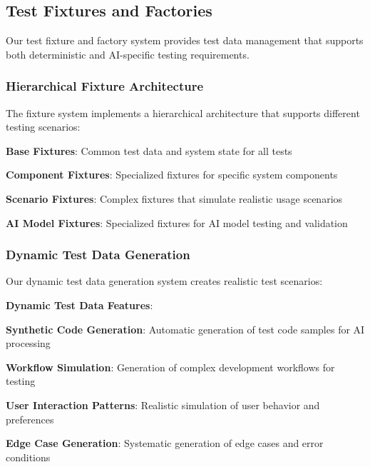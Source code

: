 \subsection*{Test Fixtures and Factories}

Our test fixture and factory system provides test data management that supports both deterministic and AI-specific testing requirements.

\subsubsection*{Hierarchical Fixture Architecture}

The fixture system implements a hierarchical architecture that supports different testing scenarios:

\begin{compactlist}
    \item \textbf{Base Fixtures}: Common test data and system state for all tests
    \item \textbf{Component Fixtures}: Specialized fixtures for specific system components
    \item \textbf{Scenario Fixtures}: Complex fixtures that simulate realistic usage scenarios
    \item \textbf{AI Model Fixtures}: Specialized fixtures for AI model testing and validation
\end{compactlist}

\subsubsection*{Dynamic Test Data Generation}

Our dynamic test data generation system creates realistic test scenarios:

\begin{successbox}
\textbf{Dynamic Test Data Features}:
\begin{compactlist}
    \item \textbf{Synthetic Code Generation}: Automatic generation of test code samples for AI processing
    \item \textbf{Workflow Simulation}: Generation of complex development workflows for testing
    \item \textbf{User Interaction Patterns}: Realistic simulation of user behavior and preferences
    \item \textbf{Edge Case Generation}: Systematic generation of edge cases and error conditions
\end{compactlist}
\end{successbox}

